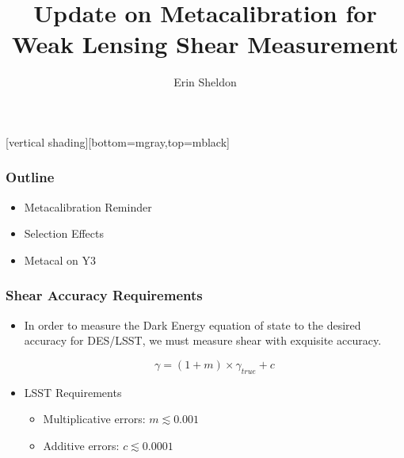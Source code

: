 \documentclass{beamer}
\title{Update on Metacalibration for Weak Lensing Shear Measurement}
\author{Erin Sheldon}
\institute{Brookhaven National Laboratory}
\begin{document}
\frame{\titlepage}


[vertical shading][bottom=mgray,top=mblack]

\frame
{
    \frametitle{Outline}

 
    \begin{itemize}

        \item Metacalibration Reminder

        \item Selection Effects

        \item Metacal on Y3

    \end{itemize}

}

\frame
{
    \frametitle{Shear Accuracy Requirements}

 
    \begin{itemize}

        \item In order to measure the Dark Energy equation of state
            to the desired accuracy for DES/LSST, we must measure
            shear with exquisite accuracy.

            {\color{lightskyblue}
                \begin{equation}
                    \gamma = (1 + m ) \times \gamma_{true} + c \nonumber
                \end{equation}
            } 

        \item LSST Requirements
            \begin{itemize}
                \item Multiplicative errors: {\color{gold} $m \lesssim 0.001$}
                \item Additive errors: {\color{brightred} $c \lesssim 0.0001$}
            \end{itemize}


    \end{itemize}

}
\end{document}
